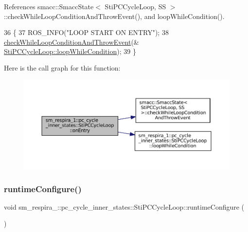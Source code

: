 References smacc\+::\+Smacc\+State$<$ Sti\+P\+C\+Cycle\+Loop, S\+S $>$\+::check\+While\+Loop\+Condition\+And\+Throw\+Event(), and loop\+While\+Condition().


\begin{DoxyCode}
36   \{
37     ROS\_INFO(\textcolor{stringliteral}{"LOOP START ON ENTRY"});
38     \hyperlink{classsmacc_1_1SmaccState_a80082718f226bebedb589f0c4696001d}{checkWhileLoopConditionAndThrowEvent}(&
      \hyperlink{structsm__respira__1_1_1pc__cycle__inner__states_1_1StiPCCycleLoop_adecc8cd6a0ae369ee8a6df33bcff8cb7}{StiPCCycleLoop::loopWhileCondition});
39   \}
\end{DoxyCode}
Here is the call graph for this function\+:
\nopagebreak
\begin{figure}[H]
\begin{center}
\leavevmode
\includegraphics[width=350pt]{structsm__respira__1_1_1pc__cycle__inner__states_1_1StiPCCycleLoop_aae3becd89262e6d935994c17c3b3913c_cgraph}
\end{center}
\end{figure}
\mbox{\label{structsm__respira__1_1_1pc__cycle__inner__states_1_1StiPCCycleLoop_a4ce8257f51c7d134bf125e3585d5731b}} 
\subsubsection{\texorpdfstring{runtime\+Configure()}{runtimeConfigure()}}
{\footnotesize\ttfamily void sm\+\_\+respira\+\_\+::pc\+\_\+cycle\+\_\+inner\+\_\+states\+::\+Sti\+P\+C\+Cycle\+Loop\+::runtime\+Configure (\begin{DoxyParamCaption}{ }\end{DoxyParamCaption})\hspace{0.3cm}{\ttfamily [inline]}}



